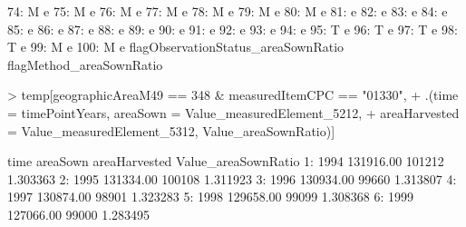 \documentclass[nojss]{jss}
\begin{document}
\begin{Schunk}
\begin{Soutput}
 74:                                   M                        e
 75:                                   M                        e
 76:                                   M                        e
 77:                                   M                        e
 78:                                   M                        e
 79:                                   M                        e
 80:                                   M                        e
 81:                                                            e
 82:                                                            e
 83:                                                            e
 84:                                                            e
 85:                                                            e
 86:                                                            e
 87:                                                            e
 88:                                                            e
 89:                                                            e
 90:                                                            e
 91:                                                            e
 92:                                                            e
 93:                                                            e
 94:                                                            e
 95:                                   T                        e
 96:                                   T                        e
 97:                                   T                        e
 98:                                   T                        e
 99:                                   M                        e
100:                                   M                        e
     flagObservationStatus_areaSownRatio flagMethod_areaSownRatio
\end{Soutput}
\begin{Sinput}
> temp[geographicAreaM49 == 348 & measuredItemCPC == "01330",
+      .(time = timePointYears, areaSown = Value_measuredElement_5212,
+        areaHarvested = Value_measuredElement_5312, Value_areaSownRatio)]
\end{Sinput}
\begin{Soutput}
    time  areaSown areaHarvested Value_areaSownRatio
 1: 1994 131916.00        101212            1.303363
 2: 1995 131334.00        100108            1.311923
 3: 1996 130934.00         99660            1.313807
 4: 1997 130874.00         98901            1.323283
 5: 1998 129658.00         99099            1.308368
 6: 1999 127066.00         99000            1.283495

\end{Soutput}
\end{Schunk}
\end{document}
